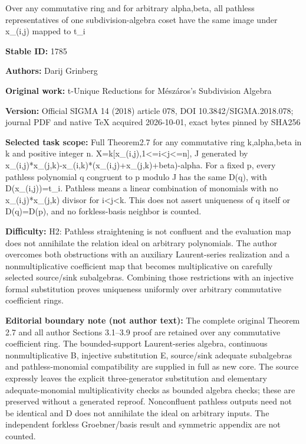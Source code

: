 \documentclass[11pt]{article}
\numberwithin{equation}{section}
\begin{document}
\begin{center}\Large Over any commutative ring and for arbitrary alpha,beta, all pathless representatives of one subdivision-algebra coset have the same image under x\_(i,j) mapped to t\_i\end{center}
\noindent\textbf{Stable ID:} 1785\par
\noindent\textbf{Authors:} Darij Grinberg\par
\noindent\textbf{Original work:} t-Unique Reductions for Mészáros's Subdivision Algebra\par
\noindent\textbf{Version:} Official SIGMA 14 (2018) article 078, DOI 10.3842/SIGMA.2018.078; journal PDF and native TeX acquired 2026-10-01, exact bytes pinned by SHA256\par
\noindent\textbf{Selected task scope:} Full Theorem2.7 for any commutative ring k,alpha,beta in k and positive integer n. X=\allowbreak{}k[x\_(i,j),1<=\allowbreak{}i<j<=\allowbreak{}n], J generated by x\_(i,j)*\allowbreak{}x\_(j,k)-x\_(i,k)*\allowbreak{}(x\_(i,j)+\allowbreak{}x\_(j,k)+\allowbreak{}beta)-alpha. For a fixed p, every pathless polynomial q congruent to p modulo J has the same D(q), with D(x\_(i,j))=\allowbreak{}t\_i. Pathless means a linear combination of monomials with no x\_(i,j)*\allowbreak{}x\_(j,k) divisor for i<j<k. This does not assert uniqueness of q itself or D(q)=\allowbreak{}D(p), and no forkless-basis neighbor is counted.\par
\noindent\textbf{Difficulty:} H2: Pathless straightening is not confluent and the evaluation map does not annihilate the relation ideal on arbitrary polynomials. The author overcomes both obstructions with an auxiliary Laurent-series realization and a nonmultiplicative coefficient map that becomes multiplicative on carefully selected source/sink subalgebras. Combining those restrictions with an injective formal substitution proves uniqueness uniformly over arbitrary commutative coefficient rings.\par
\noindent\textbf{Editorial boundary note (not author text):} The complete original Theorem 2.7 and all author Sections 3.1–3.9 proof are retained over any commutative coefficient ring. The bounded-support Laurent-series algebra, continuous nonmultiplicative B, injective substitution E, source/sink adequate subalgebras and pathless-monomial compatibility are supplied in full as new core. The source expressly leaves the explicit three-generator substitution and elementary adequate-monomial multiplicativity checks as bounded algebra checks; these are preserved without a generated reproof. Nonconfluent pathless outputs need not be identical and D does not annihilate the ideal on arbitrary inputs. The independent forkless Groebner/basis result and symmetric appendix are not counted.\par
\end{document}
